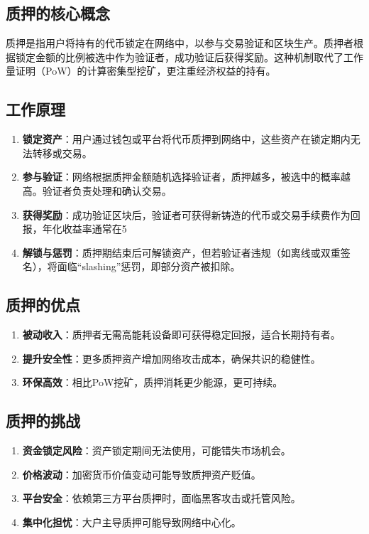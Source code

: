 \documentclass[12pt]{ctexart}
\begin{document}
\subsection{质押的核心概念}
质押是指用户将持有的代币锁定在网络中，以参与交易验证和区块生产。质押者根据锁定金额的比例被选中作为验证者，成功验证后获得奖励。这种机制取代了工作量证明（PoW）的计算密集型挖矿，更注重经济权益的持有。
\subsection{工作原理}
\begin{enumerate}
\item \textbf{锁定资产}：用户通过钱包或平台将代币质押到网络中，这些资产在锁定期内无法转移或交易。
\item \textbf{参与验证}：网络根据质押金额随机选择验证者，质押越多，被选中的概率越高。验证者负责处理和确认交易。
\item \textbf{获得奖励}：成功验证区块后，验证者可获得新铸造的代币或交易手续费作为回报，年化收益率通常在5%
\item \textbf{解锁与惩罚}：质押期结束后可解锁资产，但若验证者违规（如离线或双重签名），将面临“slashing”惩罚，即部分资产被扣除。
\end{enumerate}
\subsection{质押的优点}
\begin{enumerate}
\item \textbf{被动收入}：质押者无需高能耗设备即可获得稳定回报，适合长期持有者。
\item \textbf{提升安全性}：更多质押资产增加网络攻击成本，确保共识的稳健性。
\item \textbf{环保高效}：相比PoW挖矿，质押消耗更少能源，更可持续。
\end{enumerate}
\subsection{质押的挑战}
\begin{enumerate}
\item \textbf{资金锁定风险}：资产锁定期间无法使用，可能错失市场机会。
\item \textbf{价格波动}：加密货币价值变动可能导致质押资产贬值。
\item \textbf{平台安全}：依赖第三方平台质押时，面临黑客攻击或托管风险。
\item \textbf{集中化担忧}：大户主导质押可能导致网络中心化。
\end{enumerate}
\end{document}

